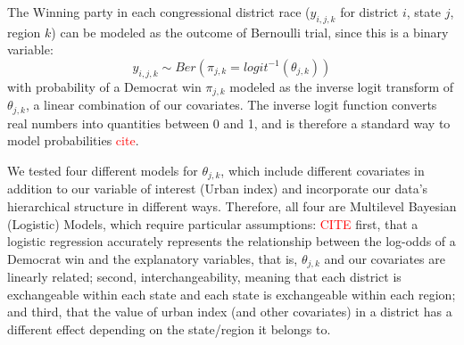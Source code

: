 \documentclass[12pt]{article}
\begin{document}
%
%
%
%

The Winning party in each congressional district race ($y_{i,j,k}$ for district $i$, state $j$, region $k$) can be modeled as the outcome of Bernoulli trial, since this is a binary variable: 
\begin{equation}
	y_{i,j,k} \sim Ber \left( \pi_{j,k} = logit^{-1}(\theta_{j,k})  \right)
\end{equation}
with probability of a Democrat win $\pi_{j,k}$ modeled as the inverse logit transform of $\theta_{j,k}$, a linear combination of our covariates. The inverse logit function converts real numbers into quantities between 0 and 1, and is therefore a standard way to model probabilities \textcolor{red}{cite}.


We tested four different models for $\theta_{j,k}$, which include different covariates in addition to our variable of interest (Urban index) and incorporate our data's hierarchical structure in different ways. Therefore, all four are Multilevel Bayesian (Logistic) Models, which require particular assumptions: \textcolor{red}{CITE} 
first, that a logistic regression accurately represents the relationship between the log-odds of a Democrat win and the explanatory variables, that is, $\theta_{j,k}$ and our covariates are linearly related; second, interchangeability, meaning that each district is exchangeable within each state and each state is exchangeable within each region; and third, that the value of urban index (and other covariates) in a district has a different effect depending on the state/region it belongs to.
\end{document}
